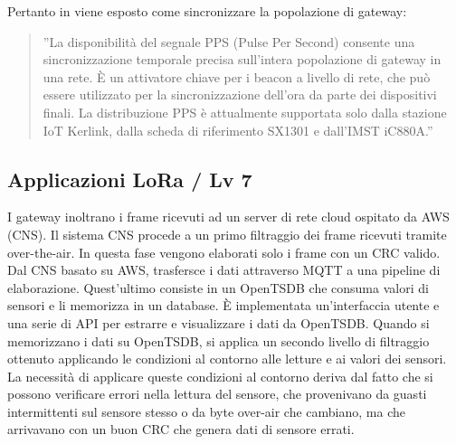 \documentclass[a4paper]{report} %
\begin{document}
Pertanto in \cite{art:rif.30} viene esposto come sincronizzare la popolazione di gateway:
\begin{quote}
	''La disponibilità del segnale PPS (Pulse Per Second) consente una sincronizzazione temporale precisa sull'intera popolazione di gateway in una rete. È un attivatore chiave per i beacon a livello di rete, che può essere utilizzato per la sincronizzazione dell'ora da parte dei dispositivi finali. La distribuzione PPS è attualmente supportata solo dalla stazione IoT Kerlink, dalla scheda di riferimento SX1301 e dall'IMST iC880A.''
\end{quote}

\subsection{Applicazioni LoRa / Lv 7}
\cite{art:rif.43}
I gateway inoltrano i frame ricevuti ad un server di rete cloud ospitato da AWS (CNS). Il sistema CNS procede a un primo filtraggio dei frame ricevuti tramite over-the-air. In questa fase vengono elaborati solo i frame con un CRC valido. Dal CNS basato su AWS, trasfersce i dati attraverso MQTT a una pipeline di elaborazione. Quest'ultimo consiste in un OpenTSDB che consuma valori di sensori e li memorizza in un database. È implementata un'interfaccia utente e una serie di API per estrarre e visualizzare i dati da OpenTSDB. Quando si memorizzano i dati su OpenTSDB, si applica un secondo livello di filtraggio ottenuto applicando le condizioni al contorno alle letture e ai valori dei sensori. La necessità di applicare queste condizioni al contorno deriva dal fatto che si possono verificare errori nella lettura del sensore, che provenivano da guasti intermittenti sul sensore stesso o da byte over-air che cambiano, ma che arrivavano con un buon CRC che genera dati di sensore errati.
\end{document}
